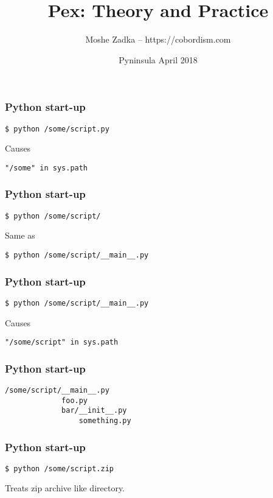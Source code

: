 \usepackage[utf8]{inputenc}
\usepackage{listings}

\title{Pex: Theory and Practice}
\author{Moshe Zadka -- https://cobordism.com}
\date{Pyninsula April 2018}
 

 
\frame{\titlepage}

\maketitle

\begin{frame}[fragile]
\frametitle{Python start-up}
\begin{lstlisting}
$ python /some/script.py
\end{lstlisting}
Causes
\begin{lstlisting}
"/some" in sys.path
\end{lstlisting}
\end{frame}

\begin{frame}[fragile]
\frametitle{Python start-up}
\begin{lstlisting}
$ python /some/script/
\end{lstlisting}
Same as
\begin{lstlisting}
$ python /some/script/__main__.py
\end{lstlisting}
\end{frame}

\begin{frame}[fragile]
\frametitle{Python start-up}
\begin{lstlisting}
$ python /some/script/__main__.py
\end{lstlisting}
Causes
\begin{lstlisting}
"/some/script" in sys.path
\end{lstlisting}
\end{frame}

\begin{frame}[fragile]
\frametitle{Python start-up}
\begin{lstlisting}
/some/script/__main__.py
             foo.py
             bar/__init__.py
                 something.py
\end{lstlisting}
\end{frame}

\begin{frame}[fragile]
\frametitle{Python start-up}
\begin{lstlisting}
$ python /some/script.zip
\end{lstlisting}
Treats zip archive like directory.
\end{frame}

